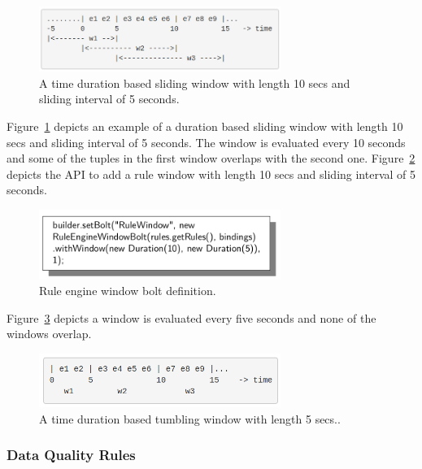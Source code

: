 \begin{figure}[h!]
  \centering
  \includegraphics[width=0.7\textwidth]{Figures/SlidingWindow.png}
  \caption{A time duration based sliding window with length 10 secs and sliding interval of 5 seconds.}
  \label{fig:SlideBolt}
\end{figure}

Figure~\ref{fig:SlideBolt} depicts an example of a duration based sliding window with length 10 secs and sliding interval of 5 seconds. The window is evaluated every 10 seconds and some of the tuples in the first window overlaps with the second one. Figure~\ref{fig:WindowBolt} depicts the API to add a rule window with length 10 secs and sliding interval of 5 seconds.

\begin{figure}[h!]
  \centering
  \includegraphics[width=0.7\textwidth]{Figures/WindowBolt.png}
  \caption{Rule engine window bolt definition.}
  \label{fig:WindowBolt}
\end{figure}

Figure~\ref{fig:TumbBolt} depicts a window is evaluated every five seconds and none of the windows overlap.

\begin{figure}[h!]
  \centering
  \includegraphics[width=0.7\textwidth]{Figures/TumblingWindow.png}
  \caption{A time duration based tumbling window with length 5 secs..}
  \label{fig:TumbBolt}
\end{figure}


\subsubsection{Data Quality Rules}

